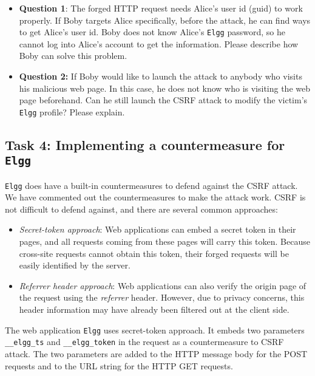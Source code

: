 \begin{itemize}
   \item \textbf{Question 1}: The forged HTTP request needs Alice's user
   id (guid) to work properly. If Boby targets Alice specifically, before
   the attack, he can find ways to get Alice's user id. Boby does not know 
   Alice's {\tt Elgg} password, so he cannot log into Alice's account to get
   the information. Please describe how Boby can solve this problem.

   
   \item \textbf{Question 2:} If Boby would like to launch the attack to
   anybody who visits his malicious web page. In this case, he does not
   know who is visiting the web page beforehand. Can he still launch the CSRF attack
   to modify the victim's {\tt Elgg} profile? Please explain.
\end{itemize}




\subsection{Task 4: Implementing a countermeasure for {\tt Elgg}} 


{\tt Elgg} does have a built-in countermeasures to 
defend against the CSRF attack. 
We have commented out the countermeasures to make the attack work. 
CSRF is not difficult to defend against, and there are several common approaches:

\begin{itemize}
   \item {\em Secret-token approach}: Web applications can embed a secret token
   in their pages, and all requests coming from these pages will carry this 
   token. Because cross-site requests cannot obtain this token, their 
   forged requests will be easily identified by the server.

   \item {\em Referrer header approach}: Web applications can also verify the origin page 
   of the request using the \emph{referrer} header. However, due to privacy
   concerns, this header information may have already been filtered out 
   at the client side.
\end{itemize}


The web application {\tt Elgg} uses secret-token approach. 
It embeds two parameters {\tt\_\_elgg\_ts} and {\tt\_\_elgg\_token} in the request as a countermeasure to CSRF attack. 
The two parameters are added to the HTTP message body for the POST requests and to the URL string for the HTTP GET requests.


